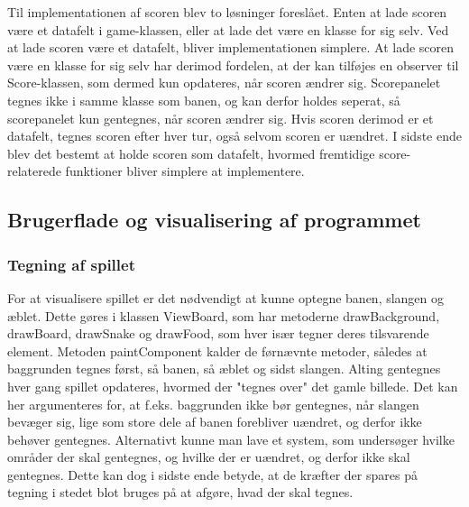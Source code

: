 \documentclass{report}
\begin{document}
Til implementationen af scoren blev to løsninger foreslået. Enten at lade scoren være et datafelt i game-klassen, eller at lade det være en klasse for sig selv. Ved at lade scoren være et datafelt, bliver implementationen simplere. At lade scoren være en klasse for sig selv har derimod fordelen, at der kan 
tilføjes en observer til Score-klassen, som dermed kun opdateres, når scoren ændrer sig. Scorepanelet tegnes ikke i samme klasse som banen, og kan derfor holdes seperat, så scorepanelet kun gentegnes, når scoren ændrer sig. Hvis scoren derimod er et datafelt, tegnes scoren efter hver tur, også selvom scoren er uændret. I sidste ende blev det bestemt at holde scoren som datafelt, hvormed fremtidige score-relaterede funktioner bliver simplere at implementere.

\subsection{Brugerflade og visualisering af programmet}
\subsubsection{Tegning af spillet}
For at visualisere spillet er det nødvendigt at kunne optegne banen, slangen og æblet. Dette gøres i klassen ViewBoard, som har metoderne drawBackground, drawBoard, drawSnake og drawFood, som hver især tegner deres tilsvarende element. Metoden paintComponent kalder de førnævnte metoder, således at baggrunden tegnes først, så banen, så æblet og sidst slangen. Alting gentegnes hver gang spillet opdateres, hvormed der "tegnes over" det gamle billede. Det kan her argumenteres for, at f.eks. baggrunden ikke bør gentegnes, når slangen bevæger sig, lige som store dele af banen forebliver uændret, og derfor ikke behøver gentegnes. Alternativt kunne man lave et system, som undersøger hvilke områder der skal gentegnes, og hvilke der er uændret, og derfor ikke skal gentegnes. Dette kan dog i sidste ende betyde, at de kræfter der spares på tegning i stedet blot bruges på at afgøre, hvad der skal tegnes.
\end{document}
